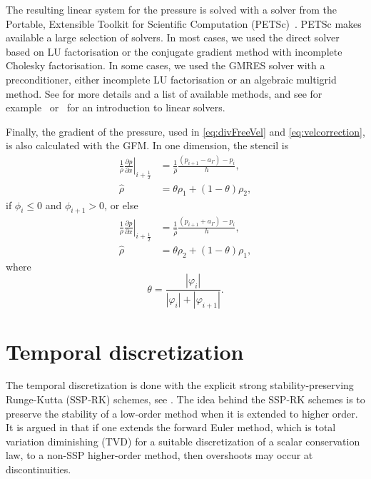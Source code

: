 \documentclass[11pt,b5paper,DIV=calc,BCOR1.3cm,headings=small,%
               footinclude=false,headsepline]{scrbook}
\newcommand*{\pd}[2]{\ensuremath{\frac{\partial #1}{\partial{#2}}}}
\begin{document}
The resulting linear system for the pressure is solved with a solver from the
Portable, Extensible Toolkit for Scientific Computation (PETSc)~\cite{PETSc}.
PETSc makes available a large selection of solvers.  In most cases, we used the
direct solver based on LU factorisation or the conjugate gradient method with
incomplete Cholesky factorisation.  In some cases, we used the GMRES solver
with a preconditioner, either incomplete LU factorisation or an algebraic
multigrid method.  See \cite{PETSc} for more details and a list of available
methods, and see for example~\cite{Iserles09} or~\cite{Saad03} for an
introduction to linear solvers.

Finally, the gradient of the pressure, used in \eqref{eq:divFreeVel} and
\eqref{eq:velcorrection}, is also calculated with the GFM.  In one dimension,
the stencil is
\begin{align}
  \left. \frac 1 \rho \pd p x\right|_{i+\frac 1 2}
           &= \frac 1 {\hat\rho} \frac{(p_{i+1} - a_\Gamma) - p_i} h, \\
  \hat\rho &= \theta\rho_1 + (1-\theta)\rho_2,
\end{align}
if $\phi_i\leq 0$ and $\phi_{i+1}>0$, or else
\begin{align}
  \left. \frac 1 \rho \pd p x\right|_{i+\frac 1 2}
           &= \frac 1 {\hat\rho} \frac{(p_{i+1} + a_\Gamma) - p_i} h, \\
  \hat\rho &= \theta\rho_2 + (1-\theta)\rho_1,
\end{align}
where
\begin{equation}
  \theta = \frac{|\varphi_{i}|}{|\varphi_{i}| + |\varphi_{i+1}|}.
\end{equation}

\section{Temporal discretization}
\label{sec:t-discr}
The temporal discretization is done with the explicit strong
stability-preserving Runge-Kutta (SSP-RK) schemes, see
\cite{Ketcheson05,Shu88}.  The idea behind the SSP-RK schemes is to preserve
the stability of a low-order method when it is extended to higher order.  It is
argued in \cite{Gottlieb01} that if one extends the forward Euler method, which
is total variation diminishing (TVD) for a suitable discretization of a scalar
conservation law, to a non-SSP higher-order method, then overshoots may occur
at discontinuities.
\end{document}
